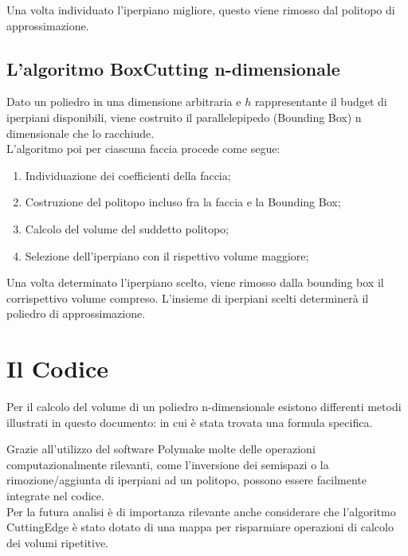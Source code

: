 Una volta individuato l'iperpiano migliore, questo viene rimosso dal politopo di approssimazione.

\subsection{L'algoritmo BoxCutting n-dimensionale}
Dato un poliedro in una dimensione arbitraria e $h$ rappresentante
il budget di iperpiani disponibili, 
viene costruito il parallelepipedo (Bounding Box) n dimensionale che lo racchiude.\\

L'algoritmo poi per ciascuna faccia procede come segue:

\begin{enumerate}
    
    \item Individuazione dei coefficienti della faccia;

    \item Costruzione del politopo incluso fra la faccia e la Bounding Box;
    
    \item Calcolo del volume del suddetto politopo;

    \item Selezione dell'iperpiano con il rispettivo volume maggiore;

\end{enumerate}

Una volta determinato l'iperpiano scelto, viene rimosso dalla bounding box il corrispettivo
volume compreso. L'insieme di iperpiani scelti determinerà il poliedro di approssimazione.

\section{Il Codice}
Per il calcolo del volume di un poliedro n-dimensionale esistono differenti metodi illustrati 
in questo documento: \cite{nDvolume} in cui è stata trovata una formula specifica.

Grazie all'utilizzo del software Polymake molte delle operazioni computazionalmente
rilevanti, come l'inversione dei semispazi o la rimozione/aggiunta di 
iperpiani ad un politopo, possono essere facilmente integrate nel codice.\\
Per la futura analisi è di importanza rilevante anche considerare che l'algoritmo 
CuttingEdge è stato dotato di una mappa per risparmiare operazioni di 
calcolo dei volumi ripetitive.

